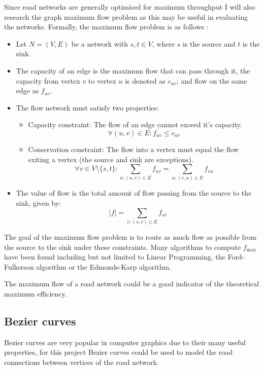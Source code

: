         Since road networks are generally optimised for maximum throughput I will also research the graph maximum flow problem as this may be useful in evaluating the networks. Formally, the maximum flow problem is as follows \cite{citation needed}:

        \begin{itemize}
            \item Let $N = (V,E)$ be a network with $s, t \in V$, where $s$ is the source and $t$ is the sink.
            \item The capacity of an edge is the maximum flow that can pass through it, the capacity from vertex $v$ to vertex $u$ is denoted as $c_{uv}$; and flow on the same edge as $f_{uv}$.
            \item The flow network must satisfy two properties:
            \begin{itemize}
                \item Capacity constraint: The flow of an edge cannot exceed it's capacity. \[\forall (u, v) \in E : f_{uv} \leq c_{uv}\]
                \item Conservation constraint: The flow into a vertex must equal the flow exiting a vertex (the source and sink are exceptions).
                \[\forall v \in V \setminus \{s, t\} : \sum_{u : (u, v) \in E} f_{uv} = \sum_{u : (v, u) \in E} f_{vu}\]
            \end{itemize}
            \item The value of flow is the total amount of flow passing from the source to the sink, given by:
            \[|f| = \sum_{v : (s, v) \in E} f_{sv}\]
        \end{itemize}

        The goal of the maximum flow problem is to route as much flow as possible from the source to the sink under these constraints. Many algorithms to compute $f_\text{max}$ have been found including but not limited to Linear Programming, the Ford-Fulkerson algorithm or the Edmonds-Karp algorithm.

        The maximum flow of a road network could be a good indicator of the theoretical maximum efficiency.

    \subsection{Bezier curves}
    \label{bezier}

        Bezier curves are very popular in computer graphics due to their many useful properties, for this project Bezier curves could be used to model the road connections between vertices of the road network.

